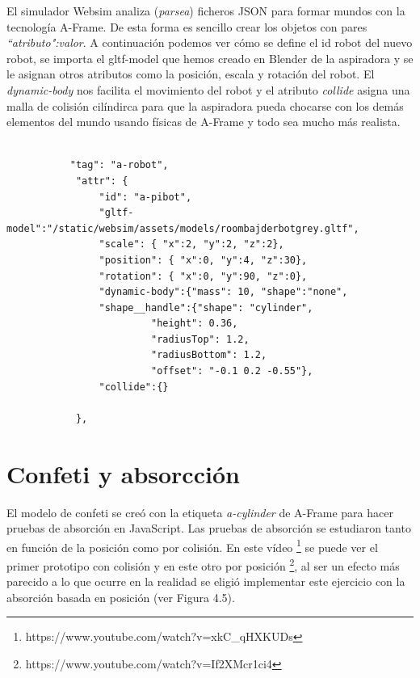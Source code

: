 El simulador Websim analiza (\textit{parsea}) ficheros JSON para formar mundos con la tecnología A-Frame. De esta forma es sencillo crear los objetos con pares \textit{``atributo":valor}. A continuación podemos ver cómo se define el id robot del nuevo robot, se importa el gltf-model que hemos creado en Blender de la aspiradora y se le asignan otros atributos como la posición, escala y rotación del robot. El \textit{dynamic-body} nos facilita el movimiento del robot y el atributo \textit{collide} asigna una malla de colisión cilíndirca para que la aspiradora pueda chocarse con los demás elementos del mundo usando físicas de A-Frame y todo sea mucho más realista.


\begin{lstlisting}
 
           "tag": "a-robot",
            "attr": {
                "id": "a-pibot",
                "gltf-model":"/static/websim/assets/models/roombajderbotgrey.gltf",
                "scale": { "x":2, "y":2, "z":2},
                "position": { "x":0, "y":4, "z":30},
                "rotation": { "x":0, "y":90, "z":0},
                "dynamic-body":{"mass": 10, "shape":"none",
                "shape__handle":{"shape": "cylinder",
                         "height": 0.36,
                         "radiusTop": 1.2,
                         "radiusBottom": 1.2,
                         "offset": "-0.1 0.2 -0.55"},
                "collide":{}

            },
\end{lstlisting}


\section{Confeti y absorcción}
El modelo de confeti se creó con la etiqueta \textit{a-cylinder} de A-Frame para hacer pruebas de absorción en JavaScript.
Las pruebas de absorción se estudiaron tanto en función de la posición como por colisión. En este vídeo \footnote{https://www.youtube.com/watch?v=xkC\_qHXKUDs} se puede ver el primer prototipo con colisión y en este otro por posición \footnote{https://www.youtube.com/watch?v=If2XMcr1ci4}, al ser un efecto más parecido a lo que ocurre en la realidad se eligió implementar este ejercicio con la absorción basada en posición (ver Figura 4.5).


